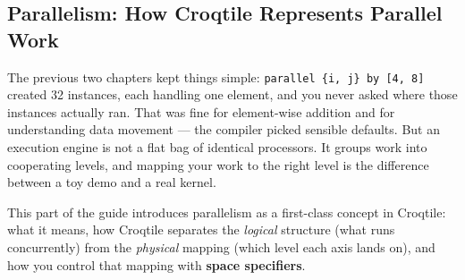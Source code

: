 \subsection*{Parallelism: How Croqtile Represents Parallel Work}

The previous two chapters kept things simple: \texttt{parallel \{i, j\} by [4, 8]} created 32 instances, each handling one element, and you never asked where those instances actually ran. That was fine for element-wise addition and for understanding data movement --- the compiler picked sensible defaults. But an execution engine is not a flat bag of identical processors. It groups work into cooperating levels, and mapping your work to the right level is the difference between a toy demo and a real kernel.

This part of the guide introduces parallelism as a first-class concept in Croqtile: what it means, how Croqtile separates the \emph{logical} structure (what runs concurrently) from the \emph{physical} mapping (which level each axis lands on), and how you control that mapping with \textbf{space specifiers}.
